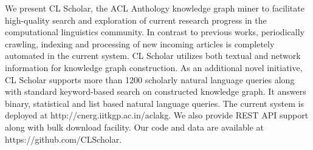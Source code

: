 We present CL Scholar, the ACL Anthology knowledge graph miner to facilitate high-quality search and exploration of current research progress in the computational linguistics community. In contrast to previous works, periodically crawling, indexing and processing of new incoming articles is completely automated in the current system. CL Scholar utilizes both textual and network information for knowledge graph construction. As an additional novel initiative, CL Scholar supports more than 1200 scholarly natural language queries along with standard keyword-based search on constructed knowledge graph. It answers binary, statistical and list based natural language queries. The current system is deployed at http://cnerg.iitkgp.ac.in/aclakg. We also provide REST API support along with bulk download facility. Our code and data are available at https://github.com/CLScholar.
